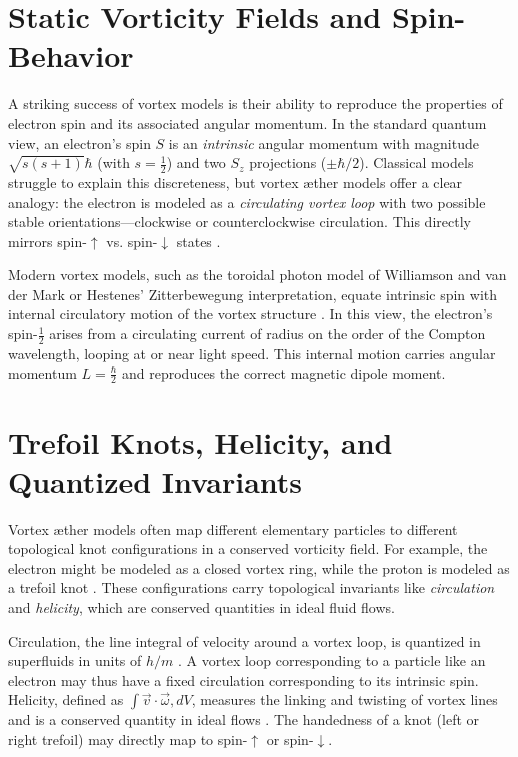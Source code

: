 \documentclass[a4paper, aps,preprint,superscriptaddress, 12pt]{revtex4}
\begin{document}
\section*{Static Vorticity Fields and Spin-\textonehalf{} Behavior}

A striking success of vortex models is their ability to reproduce the properties of electron spin and its associated angular momentum. In the standard quantum view, an electron's spin $S$ is an \textit{intrinsic} angular momentum with magnitude $\sqrt{s(s+1)}\hbar$ (with $s=\tfrac{1}{2}$) and two $S_z$ projections ($\pm \hbar/2$). Classical models struggle to explain this discreteness, but vortex æther models offer a clear analogy: the electron is modeled as a \textit{circulating vortex loop} with two possible stable orientations—clockwise or counterclockwise circulation. This directly mirrors spin-$\uparrow$ vs. spin-$\downarrow$ states \cite{KrafftEtherMatter}.


Modern vortex models, such as the toroidal photon model of Williamson and van der Mark or Hestenes' Zitterbewegung interpretation, equate intrinsic spin with internal circulatory motion of the vortex structure \cite{HestenesZitterbewegung}. In this view, the electron's spin-$\tfrac{1}{2}$ arises from a circulating current of radius on the order of the Compton wavelength, looping at or near light speed. This internal motion carries angular momentum $L=\tfrac{\hbar}{2}$ and reproduces the correct magnetic dipole moment.


\section*{Trefoil Knots, Helicity, and Quantized Invariants}

Vortex æther models often map different elementary particles to different topological knot configurations in a conserved vorticity field. For example, the electron might be modeled as a closed vortex ring, while the proton is modeled as a trefoil knot \cite{PhysicsDetectivePair}. These configurations carry topological invariants like \textit{circulation} and \textit{helicity}, which are conserved quantities in ideal fluid flows.


Circulation, the line integral of velocity around a vortex loop, is quantized in superfluids in units of $h/m$ \cite{PRR2021}. A vortex loop corresponding to a particle like an electron may thus have a fixed circulation corresponding to its intrinsic spin. Helicity, defined as $\int \vec{v} \cdot \vec{\omega}, dV$, measures the linking and twisting of vortex lines and is a conserved quantity in ideal flows \cite{PNAS2014}. The handedness of a knot (left or right trefoil) may directly map to spin-$\uparrow$ or spin-$\downarrow$.
\end{document}

